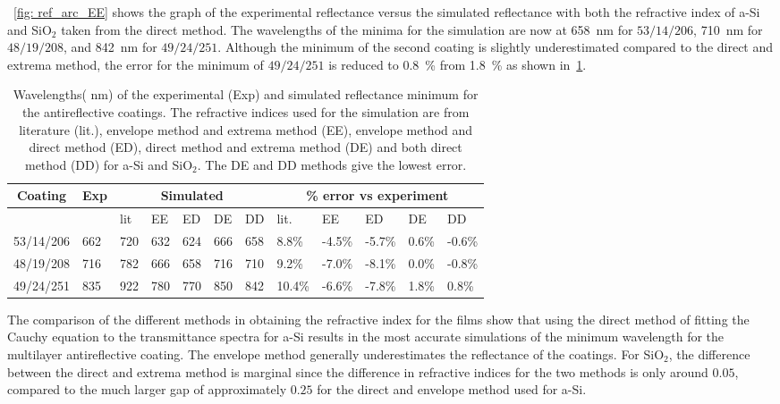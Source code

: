 ~\ref{fig: ref_arc_EE} shows the graph of the experimental reflectance versus the simulated reflectance with both the refractive index of a-Si and SiO$_2$ taken from the direct method. The wavelengths of the minima for the simulation are now at \qty{658}{\nano\meter} for $53/14/206$, \qty{710}{\nano\meter} for $48/19/208$, and \qty{842}{\nano\meter} for $49/24/251$. Although the minimum of the second coating is slightly underestimated compared to the direct and extrema method, the error for the minimum of $49/24/251$ is reduced to \qty{0.8}{\percent} from \qty{1.8}{\percent} as shown in~\ref{tab: arc_reflectance}.

\begin{table}[tbp]
\centering
\begin{tabular}{llllllllllll}
\toprule
\multicolumn{1}{c}{Coating} & \multicolumn{1}{c}{Exp} & \multicolumn{5}{c}{Simulated} & \multicolumn{5}{c}{\% error vs experiment}              \\
\midrule
\multicolumn{1}{c}{}        & \multicolumn{1}{c}{}           & lit  & EE   & ED   & DE  & DD  & lit.   & EE     & ED     & DE    & DD      \\
\midrule  
53/14/206                   & 662                            & 720  & 632  & 624  & 666 & 658 & 8.8\%  & -4.5\% & -5.7\% & 0.6\% & -0.6\% \\
48/19/208                   & 716                            & 782  & 666  & 658  & 716 & 710 & 9.2\%  & -7.0\% & -8.1\% & 0.0\% & -0.8\% \\
49/24/251                   & 835                            & 922  & 780  & 770  & 850 & 842 & 10.4\% & -6.6\% & -7.8\% & 1.8\% & 0.8\% \\
\bottomrule   
\end{tabular}
\caption{Wavelengths( \unit{\nano\meter}) of the experimental (Exp) and simulated reflectance minimum for the antireflective coatings. The refractive indices used for the simulation are from literature (lit.), envelope method and extrema method (EE), envelope method and direct method (ED), direct method and extrema method (DE) and both direct method (DD) for a-Si and SiO$_2$. The DE and DD methods give the lowest error.}\label{tab: arc_reflectance}
\end{table}

The comparison of the different methods in obtaining the refractive index for the films show that using the direct method of fitting the Cauchy equation to the transmittance spectra for a-Si results in the most accurate simulations of the minimum wavelength for the multilayer antireflective coating. The envelope method generally underestimates the reflectance of the coatings. For SiO$_2$, the difference between the direct and extrema method is marginal since the difference in refractive indices for the two methods is only around $0.05$, compared to the much larger gap of approximately $0.25$ for the direct and envelope method used for a-Si.

